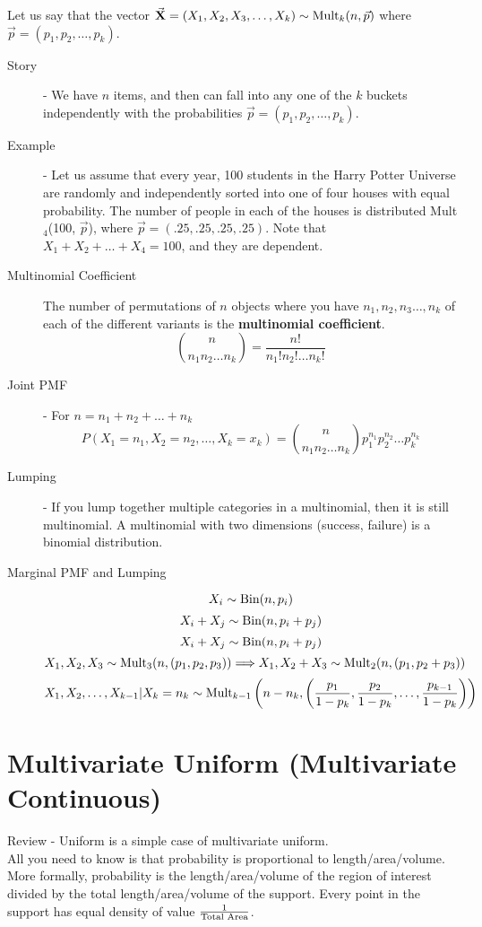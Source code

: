 \documentclass[11pt]{article}
\begin{document}
  Let us say that the vector $\vec{\textbf{X}} = (X_1, X_2, X_3, \dots, X_k) \sim \textnormal{Mult}_k(n, \vec{p})$  where $\vec{p} = (p_1, p_2, \dots, p_k)$.
\begin{description}
  \item[Story] - We have $n$ items, and then can fall into any one of the $k$ buckets independently with the probabilities $\vec{p} = (p_1, p_2, \dots, p_k)$.
  \item[Example] - Let us assume that every year, 100 students in the Harry Potter Universe are randomly and independently sorted into one of four houses with equal probability. The number of people in each of the houses is distributed Mult$_4$(100, $\vec{p}$), where $\vec{p} = (.25, .25, .25, .25)$.
    Note that $X_1 + X_2 + \dots + X_4 = 100$, and they are dependent.
  \item[Multinomial Coefficient] The number of permutations of $n$ objects where you have $n_1, n_2, n_3 \dots, n_k$ of each of the different variants is the \textbf{multinomial coefficient}.
    \[{n \choose n_1n_2\dots n_k} = \frac{n!}{n_1!n_2!\dots n_k!}\]
  \item[Joint PMF] - For $n = n_1 + n_2 + \dots + n_k$
    \[P(X_1 = n_1, X_2 = n_2, \dots, X_k = x_k) = {n \choose n_1n_2\dots n_k}p_1^{n_1}p_2^{n_2}\dots p_k^{n_k}\]
  \item[Lumping] - If you lump together multiple categories in a multinomial, then it is still multinomial. A multinomial with two dimensions (success, failure) is a binomial distribution.
  \item[Marginal PMF and Lumping]
    \[X_i \sim \textrm{Bin}(n, p_i)\]
    \[X_i + X_j \sim \textrm{Bin}(n, p_i + p_j)\]
    \[X_i + X_j \sim \textrm{Bin}(n, p_i + p_j)\]
    \[X_1, X_2, X_3 \sim \textrm{Mult}_3(n, (p_1, p_2, p_3)) \Longrightarrow X_1, X_2 + X_3 \sim \textrm{Mult}_2(n, (p_1, p_2 + p_3))\]
    \[X_1, X_2, \dots, X_{k-1} | X_k = n_k \sim \textrm{Mult}_{k-1}\left(n - n_k, \left(\frac{p_1}{1 - p_k}, \frac{p_2}{1 - p_k}, \dots, \frac{p_{k-1}}{1 - p_k}\right)\right)\]
\end{description}

\section*{Multivariate Uniform (Multivariate Continuous)}

Review - Uniform is a simple case of multivariate uniform. \\
All you need to know is that probability is proportional to length/area/volume. More formally, probability is the length/area/volume of the region of interest divided by the total length/area/volume of the support. Every point in the support has equal density of value $\frac{1}{\textnormal{Total Area}}$.
\end{document}
